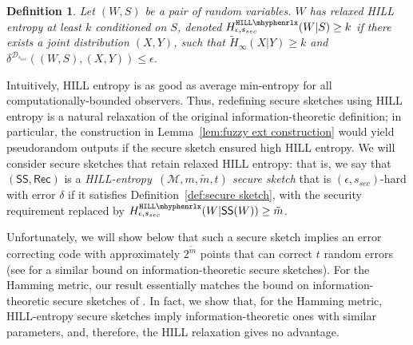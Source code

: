 \documentclass[11pt]{article}
\newcommand{\secref}[1]{\mbox{Section~\ref{#1}}}
\newcommand{\defref}[1]{\mbox{Definition~\ref{#1}}}
\newcommand{\lemref}[1]{\mbox{Lemma~\ref{#1}}}
\newcommand{\class}[1]{{\ensuremath{\mathsf{#1}}}}
\newcommand{\sketch}{\ensuremath{\class{SS}}\xspace}
\newcommand{\rec}{\ensuremath{\class{Rec}}\xspace}
\newcommand{\dis}{\ensuremath{\mathsf{dis}}}
\newcommand{\hill}{\ensuremath{\mathtt{HILL}}\xspace}
\newcommand{\hillrlx}{\ensuremath{\mathtt{HILL\mhyphen rlx}}\xspace}
\newtheorem{definition}[theorem]{Definition}
\newcommand{\authnote}[2]{{\textcolor{red}{\textsf{#1 notes: }\textcolor{blue}{ #2}}\marginpar{\textcolor{red}{\textbf{!!!!!}}}}}
\newcommand{\authnote}[2]{}
\newcommand{\lnote}[1]{{\authnote{Leo}{#1}}}
\begin{document}
\begin{definition}
\label{def:relaxed hill}
Let $(W, S)$ be a pair of random variables.  $W$ has 
\emph{relaxed HILL entropy} at least $k$ conditioned on $S$,
denoted $H^{\hillrlx}_{\epsilon, s_{sec}}(W|S)\geq k$ if there exists a joint distribution $(X, Y)$, such that $\tilde{H}_\infty(X|Y)\geq k$ and $\delta^{\mathcal{D}_{s_{sec}}} ((W, S),(X,Y))\leq \epsilon$.
\end{definition}


Intuitively, HILL entropy is as good as average min-entropy for all computationally-bounded observers.  Thus, redefining secure sketches using HILL entropy is a  natural relaxation of the original information-theoretic definition; in particular, the construction in \lemref{lem:fuzzy ext construction} would yield pseudorandom outputs if the secure sketch ensured high HILL entropy.  
We will consider secure sketches that retain relaxed HILL entropy: that is, we say that $(\sketch, \rec)$ is a  \emph{HILL-entropy~$(\mathcal{M}, m, \tilde{m}, t)$ secure sketch} that is $(\epsilon,s_{sec})$-hard with error $\delta$ if it satisfies \defref{def:secure sketch}, with the security requirement replaced by $H^{\hillrlx}_{\epsilon, s_{sec}}(W|\sketch(W))\geq \tilde{m}$. 

Unfortunately, we will show below that such a secure sketch implies an error correcting code with approximately $2^{\tilde{m}}$ points that can correct $t$ random errors (see  \cite[Lemma C.1]{DBLP:journals/siamcomp/DodisORS08} for a similar bound on information-theoretic secure sketches). For the Hamming metric, our result essentially matches the bound on information-theoretic secure sketches of \cite[Proposition 8.2]{DBLP:journals/siamcomp/DodisORS08}.  In fact, we show that, for the Hamming metric, HILL-entropy secure sketches imply information-theoretic ones with similar parameters, and, therefore, the HILL relaxation gives no advantage. 
\end{document}
